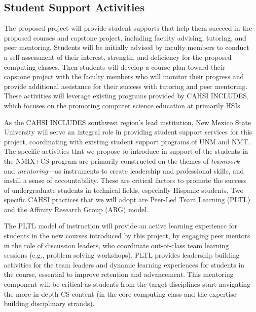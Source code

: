 \subsection{Student Support Activities}
\label{sec:framework:support}

The proposed project will provide student supports that help them succeed in the proposed courses and capstone project, including faculty advising, tutoring, and peer mentoring. Students will be initially advised by faculty members to conduct a self-assessment of their interest, strength, and deficiency for the proposed computing classes. Then students will develop a course plan toward their capstone project with the faculty members who will monitor their progress and provide additional assistance for their success with tutoring and peer mentoring. These activities will leverage existing programs provided by CAHSI INCLUDES, which focuses on the promoting computer science education at primarily HSIs.


As the CAHSI INCLUDES southwest region’s lead institution, New Mexico State University will serve an integral role in providing student support services for this project, coordinating with existing student support programs of UNM and NMT. 
The specific activities that we propose to introduce in  support of the students in the NMIX+CS program are primarily constructed on the themes of 
 \emph{teamwork} and \emph{mentoring}---as instruments to create leadership and professional
skills, and instill a sense of accountability. These are critical factors to promote the success of
undergraduate students in technical fields, especially Hispanic students. Two specific CAHSI practices that we will adopt are Peer-Led Team Learning (PLTL) and the Affinity Research Group (ARG) model. 

The PLTL model of instruction will provide an active learning experience for students in the new courses introduced by this project, by engaging peer mentors
in the role of discussion leaders, who coordinate out-of-class team learning sessions (e.g., problem
solving workshops). PLTL provides leadership building activities for the team leaders and dynamic learning experiences for students in the course, essential to improve retention and advancement. This mentoring component will be critical as students from the target disciplines start navigating the more in-depth CS content (in the core computing class and the expertise-building disciplinary strands). 

